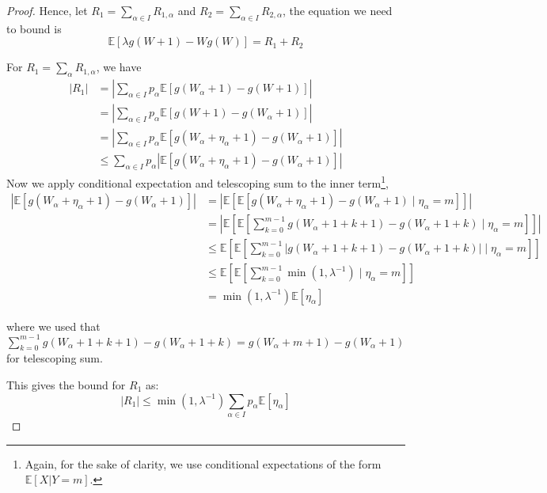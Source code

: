 \documentclass{article}
\begin{document}
\begin{proof}
    Hence, let $R_1 = \sum_{\alpha \in I} R_{1,\alpha}$ and $R_2 = \sum_{\alpha \in I} R_{2,\alpha}$,
    the equation we need to bound is
    \begin{equation*}
        \mathbb{E}[\lambda g(W+1) - Wg(W)] =  R_1 + R_2
    \end{equation*}

    For $R_1=\sum_\alpha R_{1,\alpha}$, we have
    \begin{align*}
        |R_1| &= \left|\sum_{\alpha \in I} p_\alpha \mathbb{E}[g(W_\alpha+1) - g(W+1)]\right| \\
        &= \left|\sum_{\alpha \in I} p_\alpha \mathbb{E}[g(W+1) - g(W_\alpha+1)]\right| \\
        &= \left|\sum_{\alpha \in I} p_\alpha \mathbb{E}[g(W_\alpha + \eta_\alpha +1) - g(W_\alpha+1)]\right|\\
        &\leq \sum_{\alpha \in I} p_\alpha |\mathbb{E}[g(W_\alpha + \eta_\alpha +1) - g(W_\alpha+1)]|
    \end{align*}
    Now we apply conditional expectation and telescoping sum to the inner term\footnote{Again, for the sake of clarity, we use conditional expectations of the form $\mathbb{E}[X|Y=m]$.},
    \begin{align*}
        |\mathbb{E}[g(W_\alpha + \eta_\alpha +1) - g(W_\alpha+1)]| &= 
        \left|\mathbb{E}\left[\mathbb{E}[g(W_\alpha + \eta_\alpha +1) - g(W_\alpha+1)\mid \eta_\alpha = m]\right]\right|\\
        &= \left|\mathbb{E}\left[\mathbb{E}[\sum_{k=0}^{m-1} g(W_\alpha + 1 + k+1) - g(W_\alpha + 1 + k)\mid \eta_\alpha = m]\right]\right|\\
        &\leq \mathbb{E}\left[\mathbb{E}[\sum_{k=0}^{m-1} |g(W_\alpha + 1 + k+1) - g(W_\alpha + 1 + k)|\mid \eta_\alpha = m]\right]\\
        &\leq \mathbb{E}\left[\mathbb{E}[\sum_{k=0}^{m-1} \min (1, \lambda^{-1})\mid \eta_\alpha = m]\right]\\
        &= \min (1, \lambda^{-1}) \mathbb{E}[ \eta_\alpha]
    \end{align*}

    where we used that $\sum_{k=0}^{m-1} g(W_\alpha + 1 + k+1) - g(W_\alpha + 1 + k) = g(W_\alpha +m+1)- g(W_\alpha+1)$ for telescoping sum.

    This gives the bound for $R_1$ as:
    \begin{equation*}
        |R_1| \leq \min (1, \lambda^{-1}) \sum_{\alpha \in I} p_\alpha \mathbb{E}[ \eta_\alpha]
    \end{equation*}


\end{proof}
\end{document}

